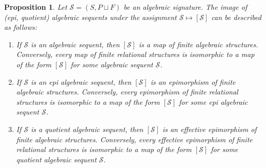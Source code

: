 \documentclass[a4paper]{article}
\newtheorem{proposition}[theorem]{Proposition}
\theoremstyle{remark}
\theoremstyle{definition}
\begin{document}
\begin{proposition}
  \label{prop:semantics-algebraic-sequents}
  Let $\mathcal{S} = (S, P \sqcup F)$ be an algebraic signature.
  The image of (epi, quotient) algebraic sequents under the assignment $\mathcal{S} \mapsto [\mathcal{S}]$ can be described as follows:
  \begin{enumerate}
    \item
      \label{itm:semantics-arbitrary-algebraic-sequent}
      If $\mathcal{S}$ is an algebraic sequent, then $[\mathcal{S}]$ is a map of finite algebraic structures.
      Conversely, every map of finite relational structures is isomorphic to a map of the form $[\mathcal{S}]$ for some algebraic sequent $\mathcal{S}$.
    \item
      \label{itm:semantics-epi-algebraic-sequent}
      If $\mathcal{S}$ is an epi algebraic sequent, then $[\mathcal{S}]$ is an epimorphism of finite algebraic structures.
      Conversely, every epimorphism of finite relational structures is isomorphic to a map of the form $[\mathcal{S}]$ for some epi algebraic sequent $\mathcal{S}$.
    \item
      \label{itm:semantics-quotient-algebraic-sequent}
      If $\mathcal{S}$ is a quotient algebraic sequent, then $[\mathcal{S}]$ is an effective epimorphism of finite algebraic structures.
      Conversely, every effective epimorphism of finite relational structures is isomorphic to a map of the form $[\mathcal{S}]$ for some quotient algebraic sequent $\mathcal{S}$.
  \end{enumerate}
\end{proposition}
\end{document}
